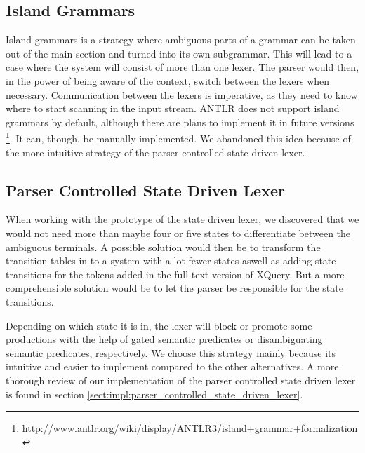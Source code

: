 \subsection{Island Grammars}
\label{sect:amiguousgrammar:islandGrammar}
Island grammars \cite{islandGrammar} is a strategy where ambiguous parts of a
grammar can be taken out of the main section and turned into its own
subgrammar. This will lead to a case where the system will consist of more than
one lexer. The parser would then, in the power of being aware of the context,
switch between the lexers when necessary. Communication between the lexers is
imperative, as they need to know where to start scanning in the input stream.
ANTLR does not support island grammars by default, although there are plans
to implement it in future versions
\footnote{http://www.antlr.org/wiki/display/ANTLR3/island+grammar+formalization}.
It can, though, be manually implemented. We abandoned this idea because of the
more intuitive strategy of the parser controlled state driven lexer.

\subsection{Parser Controlled State Driven Lexer}
\label{sect:amiguousgrammar:parserControlled}
When working with the prototype of the state driven lexer, we discovered that
we would not need more than maybe four or five states to differentiate between
the ambiguous terminals. A possible solution would then be to transform the
transition tables in \cite{createTokenizer} to a system with a lot fewer states
aswell as adding state transitions for the tokens added in the full-text
version of XQuery. But a more comprehensible solution would be to let the
parser be responsible for the state transitions.

Depending on which state it is in, the lexer will block or promote some
productions with the help of gated semantic predicates or disambiguating
semantic predicates, respectively. We choose this strategy mainly because its
intuitive and easier to implement compared to the other alternatives. A more
thorough review of our implementation of the parser controlled state driven
lexer is found in section \ref{sect:impl:parser_controlled_state_driven_lexer}.
